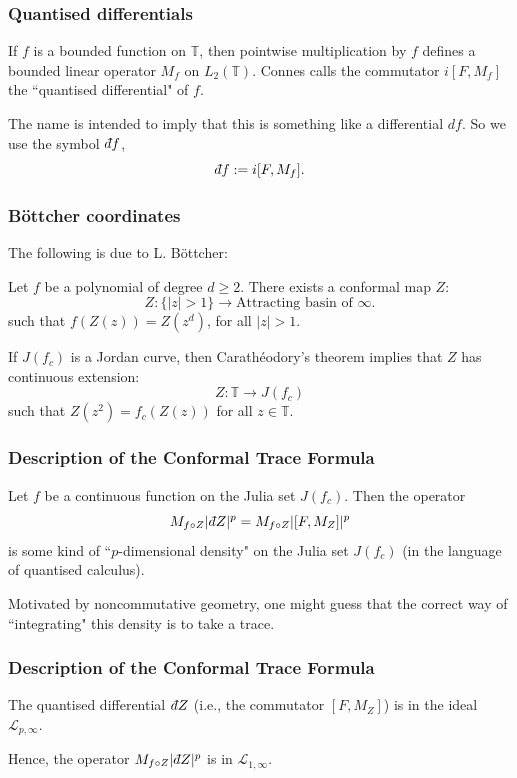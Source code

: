 \documentclass{beamer} %
\theoremstyle{definition} %
\newcommand{\Circ}{\mathbb{T}}
\newcommand{\Lc}{\mathcal{L}}
\def\qd{\,{\mathchar'26\mkern-12mu d}}
\begin{document}
\begin{frame}\frametitle{Quantised differentials}
    If $f$ is a bounded function on $\Circ$, then pointwise multiplication
    by $f$ defines a bounded linear operator $M_f$ on $L_2(\Circ)$. 
    Connes calls the commutator $i[F,M_f]$ the ``quantised differential" of $f$.
    
    The name is intended to imply that this is something like a differential $df$. So we use the symbol $\qd f$,
    \begin{equation*}
        \qd f := i[F,M_f].
    \end{equation*}
\end{frame}

\begin{frame}\frametitle{B\"ottcher coordinates}
    
    The following is due to L. B\"ottcher:
    \begin{theorem}
        Let $f$ be a polynomial of degree $d \geq 2$. There exists a conformal map $Z$:
        \begin{equation*}
            Z:\{|z| > 1\}\to \text{Attracting basin of }\infty.
        \end{equation*}
        such that $f(Z(z)) = Z(z^d)$, for all $|z| > 1$.
    \end{theorem}
    If $J(f_c)$ is a Jordan curve, then Carath\'eodory's theorem implies that $Z$ has continuous extension:
    \begin{equation*}
        Z:\Circ\to J(f_c)
    \end{equation*}
    such that $Z(z^2) = f_c(Z(z))$ for all $z \in \Circ$.
\end{frame}

\begin{frame}\frametitle{Description of the Conformal Trace Formula}
     Let $f$ be a continuous function on the Julia set $J(f_c)$. Then the operator
     \begin{equation*}
        M_{f\circ Z}|\qd Z|^p = M_{f\circ Z}|[F,M_Z]|^p
     \end{equation*}
     is some kind of ``$p$-dimensional density" on the Julia set $J(f_c)$ (in the language of quantised calculus).
     
     Motivated by noncommutative geometry, one might guess that the correct way of ``integrating" this density is to take a trace.
\end{frame}

\begin{frame}\frametitle{Description of the Conformal Trace Formula}
    \begin{lemma}
        The quantised differential $\qd Z$ (i.e., the commutator $[F,M_Z]$) is in the ideal $\Lc_{p,\infty}$.
    \end{lemma}
    Hence, the operator $M_{f\circ Z}|\qd Z|^p$ is in $\Lc_{1,\infty}$.
\end{frame}
\end{document}
